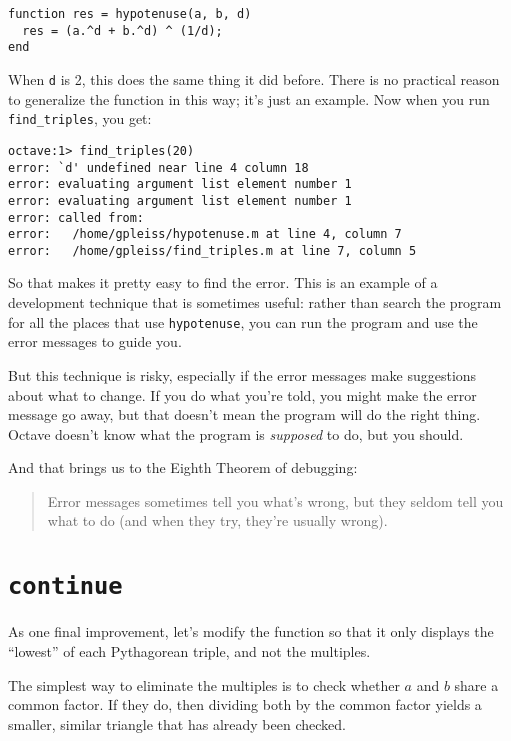 \begin{verbatim}
function res = hypotenuse(a, b, d)
  res = (a.^d + b.^d) ^ (1/d);
end
\end{verbatim}

When {\tt d} is 2, this does the same thing it did before. There is
no practical reason to generalize the function in this way; it's just
an example. Now when you run {\tt find\_triples}, you get:

\begin{verbatim}
octave:1> find_triples(20)
error: `d' undefined near line 4 column 18
error: evaluating argument list element number 1
error: evaluating argument list element number 1
error: called from:
error:   /home/gpleiss/hypotenuse.m at line 4, column 7
error:   /home/gpleiss/find_triples.m at line 7, column 5
\end{verbatim}

So that makes it pretty easy to find the error. This is an example of
a development technique that is sometimes useful: rather
than search the program for all the places that use {\tt hypotenuse},
you can run the program and use the error messages to guide you.

But this technique is risky, especially if the error messages make
suggestions about what to change. If you do what you're told, you
might make the error message go away, but that doesn't mean the
program will do the right thing. Octave doesn't know what the program
is {\em supposed} to do, but you should.

And that brings us to the Eighth Theorem of debugging:

\begin{quote}
Error messages sometimes tell you what's wrong, but they
seldom tell you what to do (and when they try, they're usually
wrong).
\end{quote}


\section{{\tt continue}}

As one final improvement, let's modify the function so that it only
displays the ``lowest'' of each Pythagorean triple, and not the
multiples.

The simplest way to eliminate the multiples is to check whether
$a$ and $b$ share a common factor. If they do, then dividing both
by the common factor yields a smaller, similar triangle that has
already been checked.

